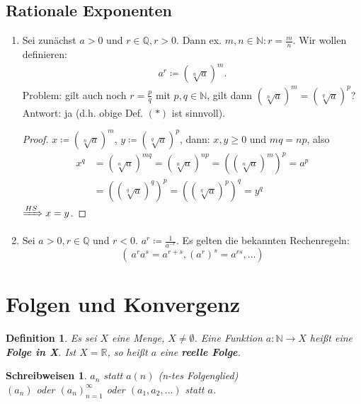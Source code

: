 \documentclass[titlepage,ngerman,a4paper,headsepline]{scrartcl}
\newcommand{\N}{\mathbb{N}}
\newcommand{\Q}{\mathbb{Q}}
\newcommand{\R}{\mathbb{R}}
\theoremstyle{named}
\theoremstyle{dotless}
\newtheorem*{definition}{Definition}
\newtheorem*{schreibweisen}{Schreibweisen}
\begin{document}
\subsection*{Rationale Exponenten}
\begin{enumerate}
	\item Sei zunächst $a > 0$ und $r \in \Q, r > 0$. Dann ex. $m, n \in \N : r = \frac{m}{n}$. Wir wollen definieren:
		\begin{align}
			a^{r} \coloneqq \left( \sqrt[n]{a} \right)^{m} \tag{$*$}.			
		\end{align}
		Problem: gilt auch noch $r = \frac{p}{q}$ mit $p, q \in \N$, gilt dann $\left( \sqrt[n]{a} \right)^{m} = \left( \sqrt[q]{a} \right)^{p}$? \\
		Antwort: ja (d.h. obige Def. $(*)$ ist sinnvoll).
		\begin{proof}
			$x \coloneqq \left( \sqrt[n]{a} \right)^{m}$, $y \coloneqq \left( \sqrt[q]{a} \right)^{p}$, dann: $x, y \geq 0$ und $mq = np$, also
			\begin{align*}
				x^{q} & = \left( \sqrt[n]{a} \right)^{mq} = \left( \sqrt[n]{a} \right)^{np} = \left(  \left( \sqrt[n]{a} \right)^{m}\right)^{p} = a^{p} \\
					  & = \left( \left( \sqrt[q]{a} \right)^{q}\right)^{p} = \left( \left( \sqrt[q]{a} \right)^{p}\right)^{q} = y^{q}
			\end{align*}
			$\xRightarrow[]{HS} x = y$.  
		\end{proof}
	\item Sei $a > 0, r \in \Q$ und $r < 0$. $a^{r} \coloneqq \frac{1}{a^{-r}}$. Es gelten die bekannten Rechenregeln:
		$$
			\left( ~ a^{r} a^{s} = a^{r + s}, \left( a^{r} \right)^{s} = a^{rs}, \dotsc \right)
		$$
\end{enumerate}


\newpage


\section{Folgen und Konvergenz}

\begin{definition}
	Es sei $X$ eine Menge, $X \neq \emptyset$. Eine Funktion $a \colon \N \to X$ hei{\ss}t eine \textbf{Folge in X}. Ist $X = \R$, so hei{\ss}t $a$ eine \textbf{reelle Folge}.
\end{definition}


\begin{schreibweisen}
$a_{n}$ statt $a(n)$ (n-tes Folgenglied) \\
$(a_{n})$ oder $(a_{n})_{n = 1}^{\infty}$ oder $(a_{1}, a_{2}, \dotsc)$ statt $a$.
\end{schreibweisen}
\end{document}
